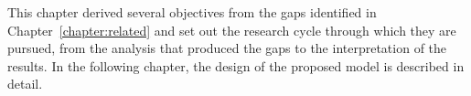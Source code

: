 This chapter derived several objectives from the gaps identified in Chapter~\ref{chapter:related} and set
out the research cycle through which they are pursued, from the analysis that produced the gaps to the
interpretation of the results. In the following chapter, the design of the proposed model is described in detail.
